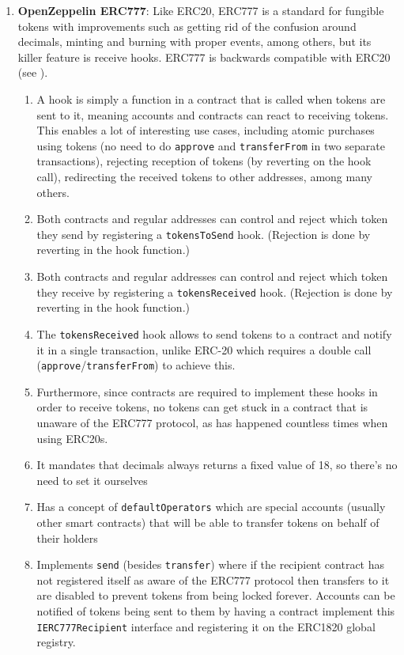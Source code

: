 \begin{enumerate}
\item\textbf{OpenZeppelin ERC777}: Like ERC20, ERC777 is a standard for fungible tokens with improvements such as getting rid of the confusion around decimals, minting and burning with proper events, among others, but its killer feature is receive hooks. ERC777 is backwards compatible with ERC20 (see \cite{jacques_dafflon_2017}).
	\begin{enumerate}
	\item A hook is simply a function in a contract that is called when tokens are sent to it, meaning accounts and contracts can react to receiving tokens. This enables a lot of interesting use cases, including atomic purchases using tokens (no need to do \verb|approve| and \verb|transferFrom| in two separate transactions), rejecting reception of tokens (by reverting on the hook call), redirecting the received tokens to other addresses, among many others.
	\item Both contracts and regular addresses can control and reject which token they send by registering a \verb|tokensToSend| hook. (Rejection is done by reverting in the hook function.)
	\item Both contracts and regular addresses can control and reject which token they receive by registering a \verb|tokensReceived| hook. (Rejection is done by reverting in the hook function.)
	\item The \verb|tokensReceived| hook allows to send tokens to a contract and notify it in a single transaction, unlike ERC-20 which requires a double call (\verb|approve|/\verb|transferFrom|) to achieve this.
	\item Furthermore, since contracts are required to implement these hooks in order to receive tokens, no tokens can get stuck in a contract that is unaware of the ERC777 protocol, as has happened countless times when using ERC20s.
	\item It mandates that decimals always returns a fixed value of 18, so there’s no need to set it ourselves
	\item Has a concept of \verb|defaultOperators| which are special accounts (usually other smart contracts) that will be able to transfer tokens on behalf of their holders
	\item Implements \verb|send| (besides \verb|transfer|) where if the recipient contract has not registered itself as aware of the ERC777 protocol then transfers to it are disabled to prevent tokens from being locked forever. Accounts can be notified of tokens being sent to them by having a contract implement this \verb|IERC777Recipient| interface and registering it on the ERC1820 global registry.
	\end{enumerate}


\end{enumerate}
